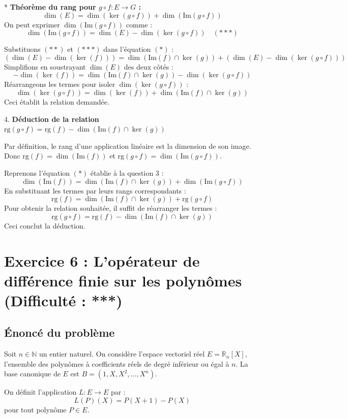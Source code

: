 \documentclass{report}
\begin{document}
    *   \textbf{Théorème du rang pour $g \circ f: E \to G$ :}
        $$ \dim(E) = \dim(\ker(g \circ f)) + \dim(\text{Im}(g \circ f)) $$
        On peut exprimer $\dim(\text{Im}(g \circ f))$ comme :
        $$ \dim(\text{Im}(g \circ f)) = \dim(E) - \dim(\ker(g \circ f)) \quad (***) $$

    Substituons $(**)$ et $(***)$ dans l'équation $(*)$ :
    $$ (\dim(E) - \dim(\ker(f))) = \dim(\text{Im}(f) \cap \ker(g)) + (\dim(E) - \dim(\ker(g \circ f))) $$
    Simplifions en soustrayant $\dim(E)$ des deux côtés :
    $$ -\dim(\ker(f)) = \dim(\text{Im}(f) \cap \ker(g)) - \dim(\ker(g \circ f)) $$
    Réarrangeons les termes pour isoler $\dim(\ker(g \circ f))$ :
    $$ \dim(\ker(g \circ f)) = \dim(\ker(f)) + \dim(\text{Im}(f) \cap \ker(g)) $$
    Ceci établit la relation demandée.

4.  \textbf{Déduction de la relation $\text{rg}(g \circ f) = \text{rg}(f) - \dim(\text{Im}(f) \cap \ker(g))$}

    Par définition, le rang d'une application linéaire est la dimension de son image.
    Donc $\text{rg}(f) = \dim(\text{Im}(f))$ et $\text{rg}(g \circ f) = \dim(\text{Im}(g \circ f))$.

    Reprenons l'équation $(*)$ établie à la question 3 :
    $$ \dim(\text{Im}(f)) = \dim(\text{Im}(f) \cap \ker(g)) + \dim(\text{Im}(g \circ f)) $$
    En substituant les termes par leurs rangs correspondants :
    $$ \text{rg}(f) = \dim(\text{Im}(f) \cap \ker(g)) + \text{rg}(g \circ f) $$
    Pour obtenir la relation souhaitée, il suffit de réarranger les termes :
    $$ \text{rg}(g \circ f) = \text{rg}(f) - \dim(\text{Im}(f) \cap \ker(g)) $$
    Ceci conclut la déduction.

\newpage
\chapter*{Exercice 6 : L'opérateur de différence finie sur les polynômes (Difficulté : ***)}

\section*{Énoncé du problème}

Soit $n \in \mathbb{N}$ un entier naturel. On considère l'espace vectoriel réel $E = \mathbb{R}_n[X]$, l'ensemble des polynômes à coefficients réels de degré inférieur ou égal à $n$. La base canonique de $E$ est $B = (1, X, X^2, \dots, X^n)$.

On définit l'application $L: E \to E$ par :
$$L(P)(X) = P(X+1) - P(X)$$
pour tout polynôme $P \in E$.
\end{document}
